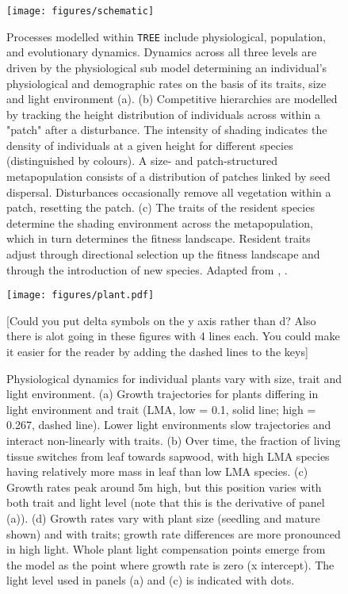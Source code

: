 \documentclass[a4paper,11pt]{article}
\begin{document}
\begin{figure}[h!]
\centering
\texttt{[image: figures/schematic]}

\caption{Processes modelled within \texttt{TREE} include physiological, population, and
evolutionary dynamics.
Dynamics across all three levels are driven by the
physiological sub model determining an individual's physiological and
demographic rates on the basis of its traits, size and light environment (a).
(b) Competitive hierarchies  are modelled by tracking the height distribution of
individuals across within a "patch" after a disturbance. The intensity
of shading indicates the density of individuals at a given height for
different species (distinguished by colours). A size- and patch-structured
metapopulation consists of a distribution of patches linked by seed dispersal.
Disturbances occasionally remove all vegetation within a patch, resetting the
patch. (c) The traits of the resident species determine the shading environment
across the metapopulation, which in turn determines the fitness landscape.
Resident traits adjust through directional selection up the fitness landscape
and through the introduction of new species. Adapted from
\citet{Falster-2011}, \citet{Falster-2015}. }

\label{fig:schematic}
\end{figure}

\newpage

\begin{figure}[h!]
\centering
\texttt{[image: figures/plant.pdf]}
\caption{Physiological dynamics for individual plants vary with size, trait
and light environment. (a) Growth trajectories for plants differing in light
environment and trait (LMA, low = 0.1, solid line; high =  0.267, dashed
line). Lower light environments slow trajectories and interact non-linearly
with traits. (b) Over time, the fraction of living tissue switches from leaf
towards sapwood, with high LMA species having relatively more mass in leaf
than low LMA species. (c) Growth rates peak around 5m high, but this position
varies with both trait and light level (note that this is the derivative of
panel (a)). (d) Growth rates vary with plant size (seedling and mature shown)
and with traits; growth rate differences are more pronounced in high light.
Whole plant light compensation points emerge from the model as the point where
growth rate is zero (x intercept).  The light level used in panels (a) and (c)
is indicated with dots.} [Could you put delta symbols on the y axis rather than d? Also there is alot going in these figures with 4 lines each. You could make it easier for the reader by adding the dashed lines to the keys]
\label{fig:plant}
\end{figure}
\end{document}
